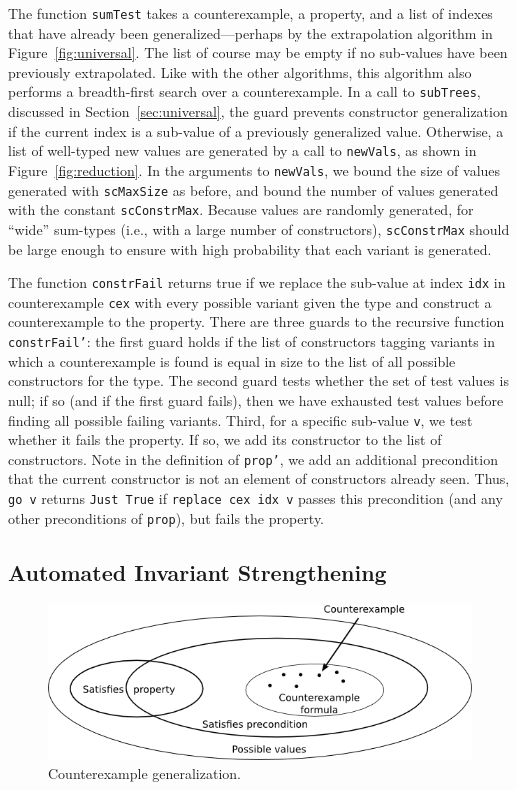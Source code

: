 \documentclass[10pt]{sigplanconf}
\newcommand{\ttp}[1]{\texttt{#1}}
\begin{document}
The function \ttp{sumTest} takes a counterexample, a property, and a list of
indexes that have already been generalized---perhaps by the extrapolation
algorithm in Figure~\ref{fig:universal}.  The list of course may be empty if no
sub-values have been previously extrapolated.  Like with the other algorithms,
this algorithm also performs a breadth-first search over a counterexample.  In a
call to \ttp{subTrees}, discussed in Section~\ref{sec:universal}, the guard
prevents constructor generalization if the current index is a sub-value of a
previously generalized value.  Otherwise, a list of well-typed new values are
generated by a call to \ttp{newVals}, as shown in Figure~\ref{fig:reduction}.
In the arguments to \ttp{newVals}, we bound the size of values generated with
\ttp{scMaxSize} as before, and bound the number of values generated with the
constant \ttp{scConstrMax}.  Because values are randomly generated, for ``wide''
sum-types (i.e., with a large number of constructors), \ttp{scConstrMax} should
be large enough to ensure with high probability that each variant is generated.

The function \ttp{constrFail} returns true if we replace the sub-value at index
\ttp{idx} in counterexample \ttp{cex} with every possible variant given the type
and construct a counterexample to the property.  There are three guards to the
recursive function \ttp{constrFail'}: the first guard holds if the list of
constructors tagging variants in which a counterexample is found is equal in
size to the list of all possible constructors for the type.  The second guard
tests whether the set of test values is null; if so (and if the first guard
fails), then we have exhausted test values before finding all possible failing
variants.  Third, for a specific sub-value \ttp{v}, we test whether it fails the
property.  If so, we add its constructor to the list of constructors.  Note in
the definition of \ttp{prop'}, we add an additional precondition that the
current constructor is not an element of constructors already seen.  Thus,
\ttp{go v} returns \ttp{Just True} if \ttp{replace cex idx v} passes this
precondition (and any other preconditions of \ttp{prop}), but fails the
property.


\subsection{Automated Invariant Strengthening}

\begin{figure}[ht!]
  \begin{center}
    \includegraphics[scale=0.5]{Figs/cex-gen}
   \end{center}
  \caption{Counterexample generalization.}
  \label{fig:cex-gen}
\end{figure}
\end{document}
